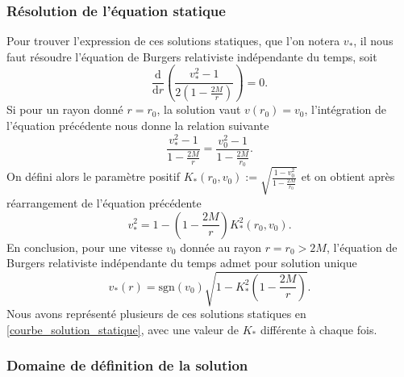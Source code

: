 \documentclass[11pt,a4paper]{article}
\begin{document}
\subsubsection{Résolution de l'équation statique}
Pour trouver l'expression de ces solutions statiques, que l'on notera $v_*$, il nous faut résoudre l'équation de Burgers relativiste indépendante du temps, soit
\begin{equation}
	\frac{\mathrm{d}}{\mathrm{d}r}\left(	\frac{v_*^2 -1}{2\left(1-\frac{2M}{r}\right)}\right) = 0.
\end{equation}
Si pour un rayon donné $r=r_0$, la solution vaut $v(r_0) = v_0$, l'intégration de l'équation précédente nous donne la relation suivante
\begin{equation}
\frac{v_*^2-1}{1-\frac{2M}{r}} = \frac{v_0^2 - 1}{1 - \frac{2M}{r_0}}.
\end{equation}
On défini alors le paramètre positif $K_*(r_0, v_0) := \sqrt{\frac{1 - v_0^2}{1 -\frac{2M}{r_0}}}$ et on obtient après réarrangement de l'équation précédente
\begin{equation}
	v_*^2 = 1 - \left(1-\frac{2M}{r}\right)K_*^2(r_0,v_0).
\end{equation}
En conclusion, pour une vitesse $v_0$ donnée au rayon $r = r_0 > 2M$, l'équation de Burgers relativiste indépendante du temps admet pour solution unique 
\begin{equation}\label{solution_statique}
	v_*(r) = \text{sgn}(v_0) \sqrt{1 - K_*^2\left(1 - \frac{2M}{r}\right)}.
\end{equation}
Nous avons représenté plusieurs de ces solutions statiques en \ref{courbe_solution_statique}, avec une valeur de $K_*$ différente à chaque fois.

\subsubsection{Domaine de définition de la solution}\label{domaine_definition}
\end{document}
